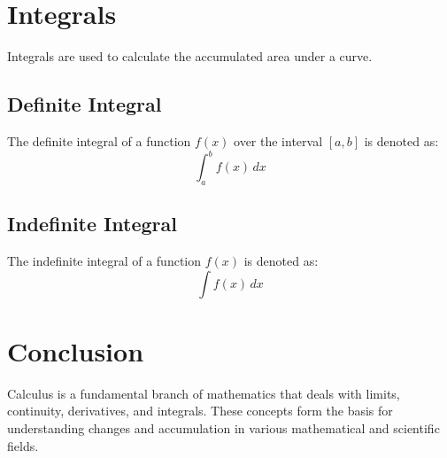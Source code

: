 \documentclass{article}
\begin{document}
\section{Integrals}
Integrals are used to calculate the accumulated area under a curve.

\subsection{Definite Integral}
The definite integral of a function \(f(x)\) over the interval \([a, b]\) is denoted as:
\[
\int_{{a}}^{{b}} f(x) \, dx
\]

\subsection{Indefinite Integral}
The indefinite integral of a function \(f(x)\) is denoted as:
\[
\int f(x) \, dx
\]

\section{Conclusion}
Calculus is a fundamental branch of mathematics that deals with limits, continuity, derivatives, and integrals. These concepts form the basis for understanding changes and accumulation in various mathematical and scientific fields.
\end{document}
